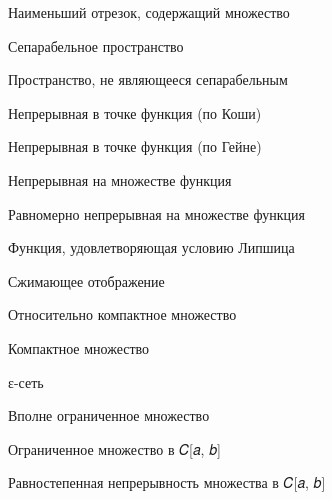 


Наименьший отрезок, содержащий множество   

Сепарабельное пространство      

Пространство, не являющееся сепарабельным  

Непрерывная в точке функция (по Коши)   

Непрерывная в точке функция (по Гейне)  

Непрерывная на множестве функция   

Равномерно непрерывная на множестве функция   

Функция, удовлетворяющая условию Липшица   

Сжимающее отображение   

Относительно компактное множество   

Компактное множество   

ε-сеть  

Вполне ограниченное множество   
  
Ограниченное множество в 𝐶[𝑎, 𝑏]

Равностепенная непрерывность множества в 𝐶[𝑎, 𝑏]   

